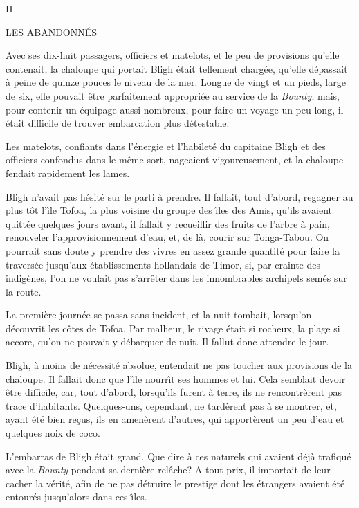 \vfill\eject


\topglue 5pc
\centerline{\sf II}
\bigskip
\centerline{\sf LES ABANDONN\'ES}
\vskip 2pc
\noindent
Avec ses dix-huit passagers, officiers et matelots,
et le peu de provisions qu'elle contenait, la chaloupe
qui portait Bligh \'etait tellement charg\'ee, qu'elle
d\'epassait \`a peine de quinze pouces le niveau de
la mer. Longue de vingt et un pieds, large de six, elle
pouvait \^etre parfaitement appropri\'ee au service de
la {\sl Bounty\/}; mais, pour contenir un \'equipage
aussi nombreux, pour faire un voyage un peu long, il
\'etait difficile de trouver embarcation plus d\'etestable.

Les matelots, confiants dans l'\'energie et l'habilet\'e
du capitaine Bligh et des officiers confondus dans le
m\^eme sort, nageaient vi\-gou\-reu\-se\-ment, et la chaloupe
fendait rapidement les lames.

Bligh n'avait pas h\'esit\'e sur le parti \`a prendre.
Il fallait, tout d'abord, regagner au plus t\^ot l'{\^\i}le
Tofoa, la plus voisine du groupe des {\^\i}les des Amis,
qu'ils avaient quitt\'ee quelques jours avant, il fallait
y recueillir des fruits de l'arbre \`a pain, renouveler
l'approvisionnement d'eau, et, de l\`a, courir sur Tonga-Tabou.
On pourrait sans doute y prendre des vivres en assez
grande quantit\'e pour faire la travers\'ee jusqu'aux
\'etablissements hollandais de Timor, si, par crainte
des indig\`enes, l'on ne voulait pas s'arr\^eter dans
les innombrables archipels sem\'es sur la route.

La premi\`ere journ\'ee se passa sans incident,
et la nuit tombait, lorsqu'on d\'ecouvrit les
c\^otes de Tofoa. Par malheur, le rivage \'etait
si rocheux, la plage si accore, qu'on ne pouvait y
d\'ebarquer de nuit. Il fallut donc attendre le jour.

Bligh, \`a moins de n\'ecessit\'e absolue,
entendait ne pas toucher aux provisions de la chaloupe.
Il fallait donc que l'{\^\i}le nourr{\^\i}t ses hommes
et lui. Cela semblait devoir \^etre difficile, car,
tout d'abord, lorsqu'ils furent \`a terre, ils ne
rencontr\`erent pas trace d'habitants.
Quelques-uns, cependant, ne tard\`erent pas \`a
se montrer, et, ayant \'et\'e bien re\c{c}us,
ils en amen\`erent d'autres, qui apport\`erent
un peu d'eau et quelques noix de coco.

L'embarras de Bligh \'etait grand.
Que dire \`a ces naturels qui avaient d\'ej\`a
trafiqu\'e avec la {\sl Bounty\/} pendant sa derni\`ere
rel\^ache? A tout prix, il importait de leur cacher
la v\'erit\'e, afin de ne pas d\'etruire
le prestige dont les \'etrangers avaient \'et\'e
entour\'es jusqu'alors dans ces {\^\i}les.

